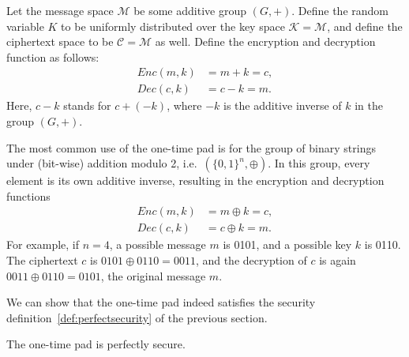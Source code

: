 \begin{definition}
Let the message space $\mathcal{M}$ be some additive group $(G,+)$. Define the random variable $K$ to be uniformly distributed over the key space $\mathcal{K} = \mathcal{M}$, and define the ciphertext space to be $\mathcal{C} = \mathcal{M}$ as well. Define the encryption and decryption function as follows:
\begin{align*}
Enc(m,k) &= m + k = c,\\
Dec(c,k) &= c -k = m.
\end{align*}
Here, $c-k$ stands for $c + (-k)$, where $-k$ is the additive inverse of $k$ in the group $(G,+)$.
\end{definition}
\begin{example}
The most common use of the one-time pad is for the group of binary strings under (bit-wise) addition modulo 2, i.e.\ $(\{0,1\}^n, \oplus)$. In this group, every element is its own additive inverse, resulting in the encryption and decryption functions
\begin{align*}
Enc(m,k) &= m \oplus k = c,\\
Dec(c,k) &= c \oplus k = m.
\end{align*}
For example, if $n=4$, a possible message $m$ is 0101, and a possible key $k$ is 0110. The ciphertext $c$ is $0101 \oplus 0110 = 0011$, and the decryption of $c$ is again $0011 \oplus 0110 = 0101$, the original message $m$.
\end{example}
We can show that the one-time pad indeed satisfies the security definition~\ref{def:perfectsecurity} of the previous section.
\begin{theorem}
The one-time pad is perfectly secure.
\end{theorem}

